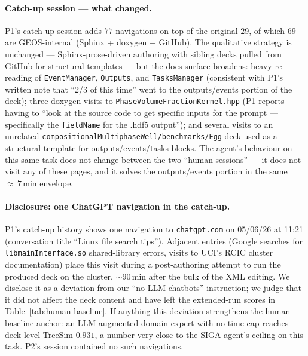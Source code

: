 \documentclass{article}
\begin{document}
\paragraph{Catch-up session --- what changed.} P1's catch-up session adds $77$ navigations on top of the original $29$, of which $69$ are GEOS-internal (Sphinx + doxygen + GitHub). The qualitative strategy is unchanged --- Sphinx-prose-driven authoring with sibling decks pulled from GitHub for structural templates --- but the docs surface broadens: heavy re-reading of \texttt{EventManager}, \texttt{Outputs}, and \texttt{TasksManager} (consistent with P1's written note that ``2/3 of this time'' went to the outputs/events portion of the deck); three doxygen visits to \texttt{PhaseVolumeFractionKernel.hpp} (P1 reports having to ``look at the source code to get specific inputs for the prompt --- specifically the \texttt{fieldName} for the .hdf5 output''); and several visits to an unrelated \texttt{compositionalMultiphaseWell/benchmarks/Egg} deck used as a structural template for outputs/events/tasks blocks. The agent's behaviour on this same task does not change between the two ``human sessions'' --- it does not visit any of these pages, and it solves the outputs/events portion in the same ${\approx}\,7\,$min envelope.

\paragraph{Disclosure: one ChatGPT navigation in the catch-up.} P1's catch-up history shows one navigation to \texttt{chatgpt.com} on 05/06/26 at 11:21 (conversation title ``Linux file search tips''). Adjacent entries (Google searches for \texttt{libmainInterface.so} shared-library errors, visits to UCI's RCIC cluster documentation) place this visit during a post-authoring attempt to run the produced deck on the cluster, ${\sim}90\,$min after the bulk of the XML editing. We disclose it as a deviation from our ``no LLM chatbots'' instruction; we judge that it did not affect the deck content and have left the extended-run scores in Table~\ref{tab:human-baseline}. If anything this deviation strengthens the human-baseline anchor: an LLM-augmented domain-expert with no time cap reaches deck-level TreeSim $0.931$, a number very close to the SIGA agent's ceiling on this task. P2's session contained no such navigations.
\end{document}
